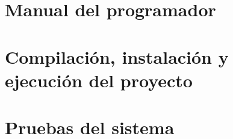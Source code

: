 \section{Manual del programador}

\section{Compilación, instalación y ejecución del proyecto}

\section{Pruebas del sistema}
